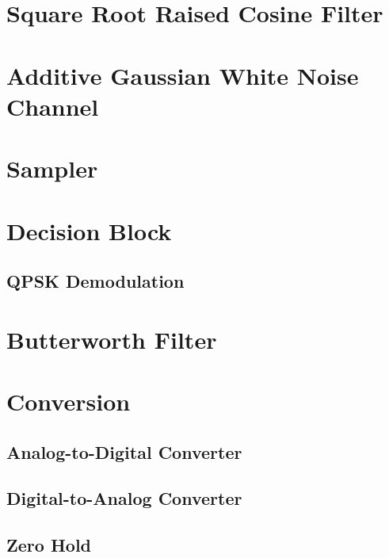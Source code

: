 \documentclass[]{article}
\begin{document}
\section{Square Root Raised Cosine Filter}
\label{app:sqrt_raised_cosine}


\section{Additive Gaussian White Noise Channel}
\label{app:awgn_channel}


\section{Sampler}
\label{app:sampler}


\section{Decision Block}
\label{app:dblocks}
\subsection{QPSK Demodulation}
\label{app:qpsk_demod}


\section{Butterworth Filter}
\label{app:butterworth}


\section{Conversion}
\label{app:convert}
\subsection{Analog-to-Digital Converter}
\label{app:ad}

\subsection{Digital-to-Analog Converter}
\label{app:da}


\subsection{Zero Hold}
\label{app:zero}


\end{document}
